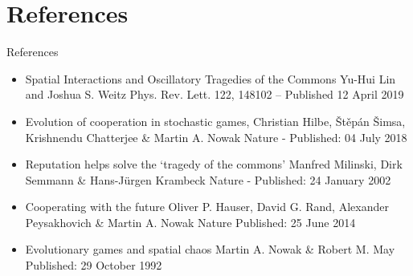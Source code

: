 \section{References}
\begin{frame}{References}
    \begin{itemize}
        \item Spatial Interactions and Oscillatory Tragedies of the Commons
        Yu-Hui Lin and Joshua S. Weitz
        Phys. Rev. Lett. 122, 148102 – Published 12 April 2019
        \item Evolution of cooperation in stochastic games, Christian Hilbe, Štěpán Šimsa, Krishnendu Chatterjee \& Martin A. Nowak 
        Nature - Published: 04 July 2018
        \item Reputation helps solve the ‘tragedy of the commons’
        Manfred Milinski, Dirk Semmann \& Hans-Jürgen Krambeck Nature - Published: 24 January 2002
        \item Cooperating with the future
        Oliver P. Hauser, David G. Rand, Alexander Peysakhovich \& Martin A. Nowak Nature Published: 25 June 2014
        \item Evolutionary games and spatial chaos
        Martin A. Nowak \& Robert M. May Published: 29 October 1992
    \end{itemize}
\end{frame}